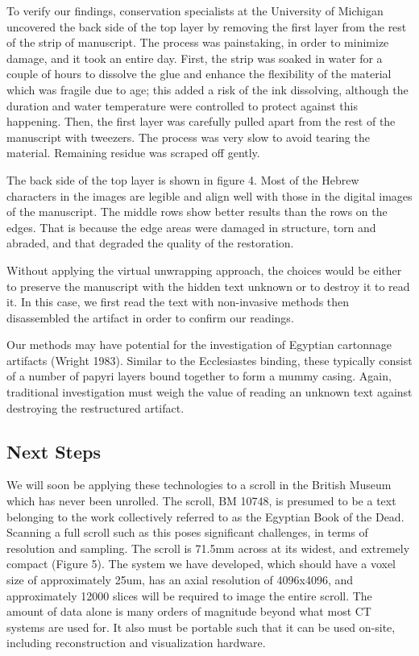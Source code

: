 \documentclass[12pt]{article}
\begin{document}
To verify our findings, conservation specialists at the University of Michigan uncovered the back side of the top layer by removing the first layer from the rest of the strip of manuscript. The process was painstaking, in order to minimize damage, and it took an entire day. First, the strip was soaked in water for a couple of hours to dissolve the glue and enhance the flexibility of the material which was fragile due to age; this added a risk of the ink dissolving, although the duration and water temperature were controlled to protect against this happening. Then, the first layer was carefully pulled apart from the rest of the manuscript with tweezers. The process was very slow to avoid tearing the material. Remaining residue was scraped off gently.
 
The back side of the top layer is shown in figure 4. Most of the Hebrew characters in the images are legible and align well with those in the digital images of the manuscript. The middle rows show better results than the rows on the edges. That is because the edge areas were damaged in structure, torn and abraded, and that degraded the quality of the restoration.
 
Without applying the virtual unwrapping approach, the choices would be either to preserve the manuscript with the hidden text unknown or to destroy it to read it. In this case, we first read the text with non-invasive methods then disassembled the artifact in order to confirm our readings.

Our methods may have potential for the investigation of  Egyptian cartonnage artifacts (Wright 1983). Similar to the Ecclesiastes binding, these typically consist of a number of papyri layers bound together to form a mummy casing. Again, traditional investigation must weigh the value of reading an unknown text against destroying the restructured artifact.

\subsection*{Next Steps}

We will soon be applying these technologies to a scroll in the British Museum which has never been unrolled. The scroll, BM 10748, is presumed to be a text belonging to the work collectively referred to as the Egyptian Book of the Dead. Scanning a full scroll such as this poses significant challenges, in terms of resolution and sampling. The scroll is 71.5mm across at its widest, and extremely compact (Figure 5). The system we have developed, which should have a voxel size of approximately 25um, has an axial resolution of 4096x4096, and approximately 12000 slices will be required to image the entire scroll. The amount of data alone is many orders of magnitude beyond what most CT systems are used for. It also must be portable such that it can be used on-site, including reconstruction and visualization hardware.
\end{document}
